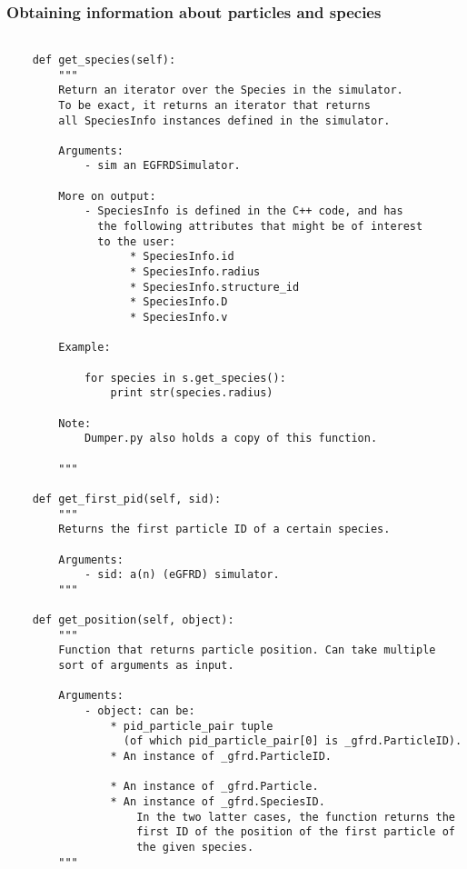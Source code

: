\documentclass[a4paper,10pt]{article}
\begin{document}
\subsubsection{Obtaining information about particles and species}

\begin{verbatim}

    def get_species(self):
        """
        Return an iterator over the Species in the simulator. 
        To be exact, it returns an iterator that returns 
        all SpeciesInfo instances defined in the simulator.
        
        Arguments: 
            - sim an EGFRDSimulator. 

        More on output:
            - SpeciesInfo is defined in the C++ code, and has
              the following attributes that might be of interest
              to the user:
                   * SpeciesInfo.id
                   * SpeciesInfo.radius
                   * SpeciesInfo.structure_id
                   * SpeciesInfo.D
                   * SpeciesInfo.v
                
        Example:

            for species in s.get_species():
                print str(species.radius)

        Note:
            Dumper.py also holds a copy of this function.        

        """

    def get_first_pid(self, sid):
        """
        Returns the first particle ID of a certain species.

        Arguments:
            - sid: a(n) (eGFRD) simulator.
        """

    def get_position(self, object):
        """
        Function that returns particle position. Can take multiple
        sort of arguments as input. 

        Arguments:
            - object: can be:
                * pid_particle_pair tuple 
                  (of which pid_particle_pair[0] is _gfrd.ParticleID).
                * An instance of _gfrd.ParticleID.

                * An instance of _gfrd.Particle.
                * An instance of _gfrd.SpeciesID.
                    In the two latter cases, the function returns the 
                    first ID of the position of the first particle of 
                    the given species.
        """ 
 
\end{verbatim}
\end{document}
